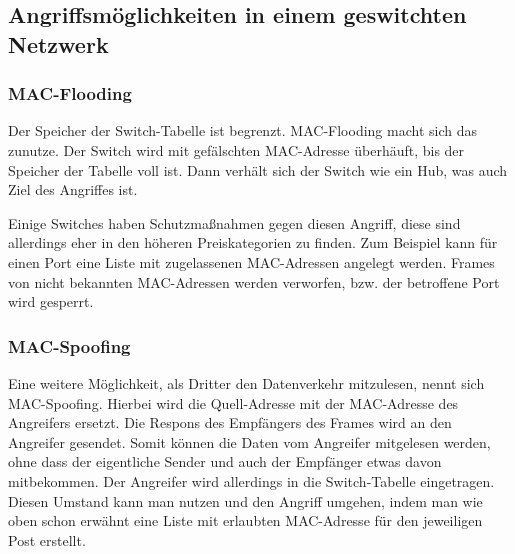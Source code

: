 \subsection{Angriffsmöglichkeiten in einem geswitchten Netzwerk}
\label{sec:geswitchtes_netz}

\subsubsection{MAC-Flooding}
Der Speicher der Switch-Tabelle ist begrenzt. MAC-Flooding macht sich das zunutze. Der Switch wird mit gefälschten MAC-Adresse überhäuft, bis der Speicher der Tabelle voll ist.
Dann verhält sich der Switch wie ein Hub, was auch Ziel des Angriffes ist.

Einige Switches haben Schutzmaßnahmen gegen diesen Angriff, diese sind allerdings eher in den höheren Preiskategorien zu finden. Zum Beispiel kann für einen Port eine Liste mit zugelassenen MAC-Adressen angelegt werden. Frames von nicht bekannten MAC-Adressen werden verworfen, bzw. der betroffene Port wird gesperrt.

\subsubsection{MAC-Spoofing}
Eine weitere Möglichkeit, als Dritter den Datenverkehr mitzulesen, nennt sich MAC-Spoofing. Hierbei wird die Quell-Adresse mit der MAC-Adresse des Angreifers ersetzt. Die Respons des Empfängers des Frames wird an den Angreifer gesendet. Somit können die Daten vom Angreifer mitgelesen werden, ohne dass der eigentliche Sender und auch der Empfänger etwas davon mitbekommen. Der Angreifer wird allerdings in die Switch-Tabelle eingetragen. Diesen Umstand kann man nutzen und den Angriff umgehen, indem man wie oben schon erwähnt eine Liste mit erlaubten MAC-Adresse für den jeweiligen Post erstellt.

